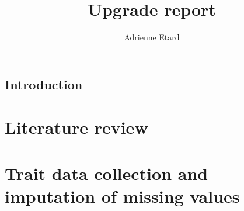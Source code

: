 \documentclass[11pt]{report}
\begin{document}
\title{Upgrade report}
\author{Adrienne Etard}

\maketitle



\section*{Introduction}

\chapter{Literature review}
%

\chapter{Trait data collection and imputation of missing values}

\end{document}
